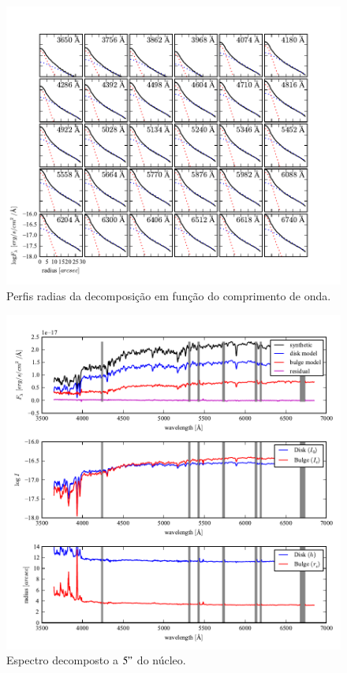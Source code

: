\begin{figure}
	\includegraphics{figuras/decomp-radial-profile}
	\caption[Perfis radias da decomposição em função do comprimento de onda]
	{Perfis radias da decomposição em função do comprimento de onda.}
	\label{fig:decompRadprof}
\end{figure}

\begin{figure}
	\includegraphics{figuras/decomp-model-quality}
	\caption[Espectro decomposto a $5"$ do núcleo] {Espectro decomposto a $5"$ do
	núcleo.}
	\label{fig:decompSpectra}
\end{figure}


